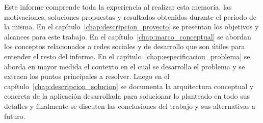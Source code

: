 \begin{intro}
  Este informe comprende toda la experiencia al realizar esta memoria, las motivaciones, soluciones propuestas y resultados obtenidos durante el periodo de la misma. En el capítulo~\ref{chap:descripcion_proyecto} se presentan los objetivos y alcances para este trabajo. En el capítulo~\ref{chap:marco_conceptual} se abordan los conceptos relacionados a redes sociales y de desarrollo que son útiles para entender el resto del informe. En el capítulo~\ref{chap:especificacion_problema} se aborda en mayor medida el contexto en el cual se desarrolla el problema y se extraen los puntos principales a resolver. Luego en el capítulo~\ref{chap:descripcion_solucion} se documenta la arquitectura conceptual y concreta de la aplicación desarrollada para solucionar lo planteado en todo sus detalles y finalmente se discuten las conclusiones del trabajo y sus alternativas a futuro.\\
  
\end{intro}
